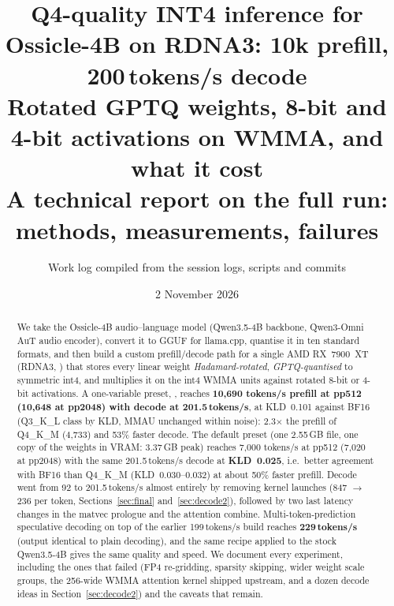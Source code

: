 \documentclass[10pt,a4paper]{article}
\title{\textbf{Q4-quality INT4 inference for Ossicle-4B on RDNA3: 10k prefill, 200\,tokens/s decode}\\[2pt]
\large Rotated GPTQ weights, 8-bit and 4-bit activations on WMMA, and what it cost\\[-2pt]
\normalsize A technical report on the full run: methods, measurements, failures}
\author{Work log compiled from the session logs, scripts and commits}
\date{2 November 2026}
\newcommand{\tx}[1]{\texttt{\detokenize{#1}}}
\begin{document}
\maketitle
\thispagestyle{empty}

\begin{abstract}
\noindent
We take the Ossicle-4B audio--language model (Qwen3.5-4B backbone, Qwen3-Omni AuT audio encoder), convert it to GGUF for
llama.cpp, quantise it in ten standard formats, and then build a custom prefill/decode path for a single AMD RX~7900~XT
(RDNA3, \tx{gfx1100}) that stores every linear weight \emph{Hadamard-rotated}, \emph{GPTQ-quantised} to symmetric int4, and
multiplies it on the int4 WMMA units against rotated 8-bit or 4-bit activations.
A one-variable preset, \tx{GGML_INT4_PREFILL=fast}, reaches \textbf{10{,}690 tokens/s prefill at pp512 (10{,}648 at pp2048) with decode at
201.5\,tokens/s}, at KLD~0.101 against BF16 (Q3\_K\_L class by KLD, MMAU unchanged within noise): 2.3$\times$ the prefill of Q4\_K\_M (4{,}733) and 53\% faster decode.
The default \tx{quality} preset (one 2.55\,GB file, one copy of the weights in VRAM: 3.37\,GB peak) reaches 7{,}000 tokens/s at pp512 (7{,}020 at pp2048) with the same
201.5\,tokens/s decode at \textbf{KLD~0.025}, i.e.\ better agreement with BF16 than Q4\_K\_M (KLD~0.030--0.032) at about 50\% faster prefill.
Decode went from 92 to 201.5\,tokens/s almost entirely by removing kernel launches (847 $\to$ 236 per token, Sections~\ref{sec:final} and~\ref{sec:decode2}), followed
by two last latency changes in the matvec prologue and the attention combine. Multi-token-prediction speculative decoding on top of the
earlier 199\,tokens/s build reaches \textbf{229\,tokens/s} (output identical to plain decoding), and the same recipe applied to the stock Qwen3.5-4B gives
the same quality and speed.
We document every experiment, including the ones that failed (FP4 re-gridding, sparsity skipping, wider weight scale groups, the
256-wide WMMA attention kernel shipped upstream, and a dozen decode ideas in Section~\ref{sec:decode2}) and the caveats that remain.
\end{abstract}
\end{document}

